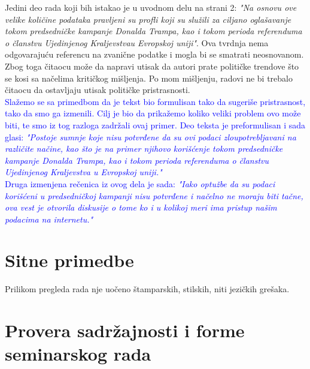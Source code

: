 \documentclass[a4paper]{report}
\newcommand{\odgovor}[1]{\textcolor{blue}{#1}}
\begin{document}
Jedini deo rada koji bih istakao je u uvodnom delu na strani 2: \emph{"Na osnovu ove velike količine podataka pravljeni su profli koji su služili za ciljano oglašavanje tokom predsedničke kampanje Donalda Trampa, kao i tokom perioda referenduma o članstvu Ujedinjenog Kraljevstvau Evropskoj uniji"}. Ova tvrdnja nema odgovarajuću referencu na zvanične podatke i mogla bi se smatrati neosnovanom. Zbog toga čitaocu može da napravi utisak da autori prate političke trendove što se kosi sa načelima kritičkog mišljenja. Po mom mišljenju, radovi ne bi trebalo čitaocu da ostavljaju utisak političke pristrasnosti.
\\
\odgovor{Slažemo se sa primedbom da je tekst bio formulisan tako da sugeriše pristrasnost, tako da smo ga izmenili. Cilj je bio da prikažemo koliko veliki problem ovo može biti, te smo iz tog razloga zadržali ovaj primer. Deo teksta je preformulisan i sada glasi: \emph{"Postoje sumnje koje nisu potvrđene da su ovi podaci zloupotrebljavani na različite načine, kao što je na primer njihovo korišćenje tokom predsedničke kampanje Donalda Trampa, kao i tokom perioda referenduma o članstvu Ujedinjenog Kraljevstva u Evropskoj uniji."}\\ Druga izmenjena rečenica iz ovog dela je sada: \emph{"Iako optužbe da su podaci korišćeni u predsedničkoj kampanji nisu potvrđene i načelno ne moraju biti tačne, ova vest je otvorila diskusije o tome ko i u kolikoj meri ima pristup našim podacima na internetu."}}

\section{Sitne primedbe}

Prilikom pregleda rada nje uočeno štamparskih, stilskih, niti jezičkih grešaka.

\section{Provera sadržajnosti i forme seminarskog rada}
\end{document}
